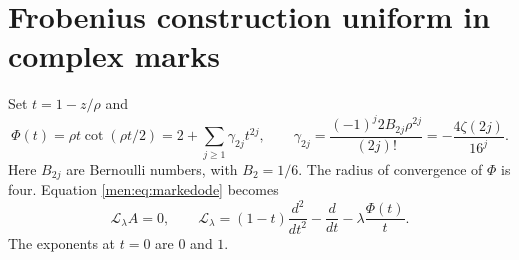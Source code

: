 \documentclass[11pt,letterpaper]{article}
\theoremstyle{remark}\newtheorem{remark}[theorem]{Remark}
\begin{document}
\section{Frobenius construction uniform in complex marks}\label{men:sec:frobenius}
Set $t=1-z/\rho$ and
\begin{equation}\label{men:eq:cfunc}
 \Phi(t)=\rho t\cot(\rho t/2)
   =2+\sum_{j\ge1}\gamma_{2j}t^{2j},\qquad
 \gamma_{2j}=\frac{(-1)^j2B_{2j}\rho^{2j}}{(2j)!}
            =-\frac{4\zeta(2j)}{16^j}.
\end{equation}
Here $B_{2j}$ are Bernoulli numbers, with $B_2=1/6$. The radius of convergence of $\Phi$ is four. Equation \eqref{men:eq:markedode} becomes
\begin{equation}\label{men:eq:L}
 \mathcal L_\lambda A=0,\qquad
 \mathcal L_\lambda=(1-t)\frac{d^2}{dt^2}-\frac d{dt}
                   -\lambda\frac{\Phi(t)}t.
\end{equation}
The exponents at $t=0$ are $0$ and $1$.
\end{document}
